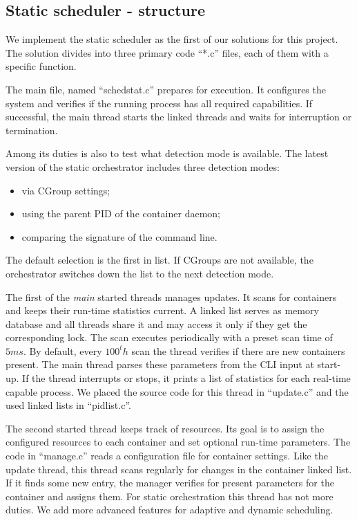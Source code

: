 \documentclass[]{scrartcl}
\begin{document}

\subsection{Static scheduler - structure}

We implement the static scheduler as the first of our solutions for this project. 
The solution divides into three primary code ``*.c'' files, each of them with a specific function. 

The main file, named ``schedstat.c'' prepares for execution.
It configures the system and verifies if the running process has all required capabilities. 
If successful, the main thread starts the linked threads and waits for interruption or termination.

Among its duties is also to test what detection mode is available.
The latest version of the static orchestrator includes three detection modes:
\begin{itemize}
	\item via CGroup settings;
	\item using the parent PID of the container daemon;
	\item comparing the signature of the command line.
\end{itemize}
The default selection is the first in list. If CGroups are not available, the orchestrator switches down the list to the next detection mode.

The first of the \emph{main} started threads manages updates. It scans for containers and keeps their run-time statistics current.  
A linked list serves as memory database and all threads share it and may access it only if they get the corresponding lock.
The scan executes periodically with a preset scan time of $5ms$. 
By default, every $100^th$ scan the thread verifies if there are new containers present.
The main thread parses these parameters from the CLI input at start-up.
If the thread interrupts or stops, it prints a list of statistics for each real-time capable process.
We placed the source code for this thread in ``update.c'' and the used linked lists in ``pidlist.c''. 

The second started thread keeps track of resources. Its goal is to assign the configured resources to each container and set optional run-time parameters.
The code in ``manage.c'' reads a configuration file for container settings.
Like the update thread, this thread scans regularly for changes in the container linked list. 
If it finds some new entry, the manager verifies for present parameters for the container and assigns them.
For static orchestration this thread has not more duties. We add more advanced features for adaptive and dynamic scheduling. 
\end{document}
